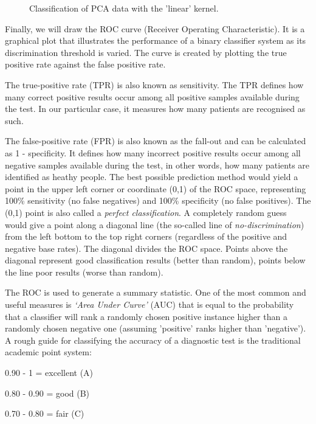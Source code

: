 \begin{figure}[H]
	\centering
	\caption{Classification of PCA data with the 'linear' kernel.}
	\label{fig:Classification3D_PCA}
\end{figure}

Finally, we will draw the ROC curve (Receiver Operating Characteristic). It  is a graphical plot that illustrates the performance of a binary classifier system as its discrimination threshold is varied. The curve is created by plotting the true positive rate against the false positive rate\cite{ROC1}.

The true-positive rate (TPR) is also known as sensitivity. The TPR defines how many correct positive results occur among all positive samples available during the test. In our particular case, it measures how many patients are recognised as such.

The false-positive rate (FPR) is also known as the fall-out and can be calculated as 1 - specificity. It defines how many incorrect positive results occur among all negative samples available during the test, in other words, how many patients are identified as heathy people.
The best possible prediction method would yield a point in the upper left corner or coordinate (0,1) of the ROC space, representing 100\% sensitivity (no false negatives) and 100\% specificity (no false positives). The (0,1) point is also called a \textit{perfect classification}. A completely random guess would give a point along a diagonal line (the so-called line of \textit{no-discrimination}) from the left bottom to the top right corners (regardless of the positive and negative base rates). The diagonal divides the ROC space. Points above the diagonal represent good classification results (better than random), points below the line poor results (worse than random)\cite{ROC1}.

The ROC is used to generate a summary statistic. One of the most common and useful measures is \textit{‘Area Under Curve’} (AUC) that is equal to the probability that a classifier will rank a randomly chosen positive instance higher than a randomly chosen negative one (assuming 'positive' ranks higher than 'negative'). A rough guide for classifying the accuracy of a diagnostic test is the traditional academic point system\cite{ROC2}:

0.90 - 1 = excellent (A)

0.80 - 0.90 = good (B)	

0.70 - 0.80 = fair (C)

